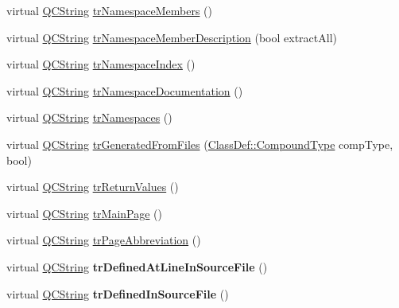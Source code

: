 \begin{DoxyCompactItemize}
\item 
virtual \mbox{\hyperlink{class_q_c_string}{Q\+C\+String}} \mbox{\hyperlink{class_translator_japanese_ae0bfa7eb76fed603dba4b1356639acda}{tr\+Namespace\+Members}} ()
\item 
virtual \mbox{\hyperlink{class_q_c_string}{Q\+C\+String}} \mbox{\hyperlink{class_translator_japanese_a19a57945319cbc2bf83d26939c812517}{tr\+Namespace\+Member\+Description}} (bool extract\+All)
\item 
virtual \mbox{\hyperlink{class_q_c_string}{Q\+C\+String}} \mbox{\hyperlink{class_translator_japanese_a236517c4d6c7bdf26cc79fd555a959df}{tr\+Namespace\+Index}} ()
\item 
virtual \mbox{\hyperlink{class_q_c_string}{Q\+C\+String}} \mbox{\hyperlink{class_translator_japanese_a250823f8ed193feca9eb5d15ffe11919}{tr\+Namespace\+Documentation}} ()
\item 
virtual \mbox{\hyperlink{class_q_c_string}{Q\+C\+String}} \mbox{\hyperlink{class_translator_japanese_a16500bded4b5f2ac97867d30c45cba56}{tr\+Namespaces}} ()
\item 
virtual \mbox{\hyperlink{class_q_c_string}{Q\+C\+String}} \mbox{\hyperlink{class_translator_japanese_a7fb359b2893fe33fd41ebde830eb8461}{tr\+Generated\+From\+Files}} (\mbox{\hyperlink{class_class_def_ae70cf86d35fe954a94c566fbcfc87939}{Class\+Def\+::\+Compound\+Type}} comp\+Type, bool)
\item 
virtual \mbox{\hyperlink{class_q_c_string}{Q\+C\+String}} \mbox{\hyperlink{class_translator_japanese_a5bedf06a919affd25020b0fdddc82cdf}{tr\+Return\+Values}} ()
\item 
virtual \mbox{\hyperlink{class_q_c_string}{Q\+C\+String}} \mbox{\hyperlink{class_translator_japanese_a25159d29b4c967bf3e9d2de18ba43243}{tr\+Main\+Page}} ()
\item 
virtual \mbox{\hyperlink{class_q_c_string}{Q\+C\+String}} \mbox{\hyperlink{class_translator_japanese_ad4a31890e3764bed24d09c54ab887dcc}{tr\+Page\+Abbreviation}} ()
\item 
\mbox{\label{class_translator_japanese_a12ea6d2966bcd4e9ea8c84c8e0b9e4c0}} 
virtual \mbox{\hyperlink{class_q_c_string}{Q\+C\+String}} {\bfseries tr\+Defined\+At\+Line\+In\+Source\+File} ()
\item 
\mbox{\label{class_translator_japanese_aa5a14c105b4dac4061f40f59dbea5f62}} 
virtual \mbox{\hyperlink{class_q_c_string}{Q\+C\+String}} {\bfseries tr\+Defined\+In\+Source\+File} ()

\end{DoxyCompactItemize}
